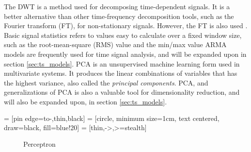 The DWT is a method used for decomposing time-dependent signals. 
It is a better alternative than other time-frequency decomposition tools, such as the Fourier transform (FT), for non-stationary signals. 
However, the FT is also used \cite{fault_detection_and_isolation_using_classifier_fusion, blade_damage_detection_sup_ml_alg}. 
Basic signal statistics refers to values easy to calculate over a fixed window size, such as the root-mean-square (RMS) value and the min/max value 
ARMA models are frequently used for time signal analysis, and will be expanded upon in section \ref{sec:ts_models}. 
PCA is an unsupervised machine learning form used in multivariate systems. 
It produces the linear combinations of variables that has the highest variance, also called the \textit{principal components}.
PCA, and generalizations of PCA is also a valuable tool for dimensionality reduction, and will also be expanded upon, in section \ref{sec:ts_models}. 


 = [pin edge={to-,thin,black}]
 = [circle, minimum size=1cm, text centered, draw=black, fill=blue!20]
 = [thin,->,>=stealth]

\begin{figure}
\begin{center}


\end{center}
\caption{Perceptron} 
\label{fig:perc}
\end{figure}

